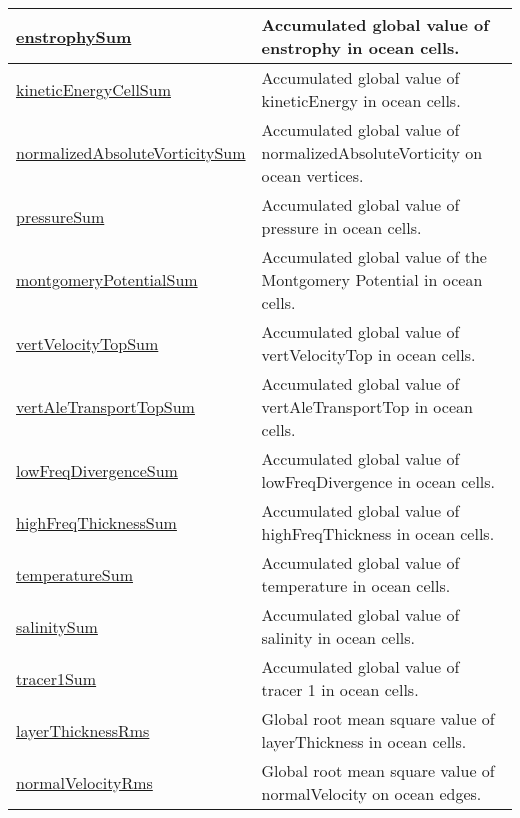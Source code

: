 {\begin{center}
\begin{longtable}{| p{2.0in} | p{4.0in} |}
	\hline
	\hyperref[subsec:var_sec_amGlobalStats_enstrophySum]{enstrophySum} & Accumulated global value of enstrophy in ocean cells. \\
	\hline
	\hyperref[subsec:var_sec_amGlobalStats_kineticEnergyCellSum]{kineticEnergyCellSum} & Accumulated global value of kineticEnergy in ocean cells. \\
	\hline
	\hyperref[subsec:var_sec_amGlobalStats_normalizedAbsoluteVorticitySum]{normalizedAbsoluteVorticitySum} & Accumulated global value of normalizedAbsoluteVorticity on ocean vertices. \\
	\hline
	\hyperref[subsec:var_sec_amGlobalStats_pressureSum]{pressureSum} & Accumulated global value of pressure in ocean cells. \\
	\hline
	\hyperref[subsec:var_sec_amGlobalStats_montgomeryPotentialSum]{montgomeryPotentialSum} & Accumulated global value of the Montgomery Potential in ocean cells. \\
	\hline
	\hyperref[subsec:var_sec_amGlobalStats_vertVelocityTopSum]{vertVelocityTopSum} & Accumulated global value of vertVelocityTop in ocean cells. \\
	\hline
	\hyperref[subsec:var_sec_amGlobalStats_vertAleTransportTopSum]{vertAleTransportTopSum} & Accumulated global value of vertAleTransportTop in ocean cells. \\
	\hline
	\hyperref[subsec:var_sec_amGlobalStats_lowFreqDivergenceSum]{lowFreqDivergenceSum} & Accumulated global value of lowFreqDivergence in ocean cells. \\
	\hline
	\hyperref[subsec:var_sec_amGlobalStats_highFreqThicknessSum]{highFreqThicknessSum} & Accumulated global value of highFreqThickness in ocean cells. \\
	\hline
	\hyperref[subsec:var_sec_amGlobalStats_temperatureSum]{temperatureSum} & Accumulated global value of temperature in ocean cells. \\
	\hline
	\hyperref[subsec:var_sec_amGlobalStats_salinitySum]{salinitySum} & Accumulated global value of salinity in ocean cells. \\
	\hline
	\hyperref[subsec:var_sec_amGlobalStats_tracer1Sum]{tracer1Sum} & Accumulated global value of tracer 1 in ocean cells. \\
	\hline
	\hyperref[subsec:var_sec_amGlobalStats_layerThicknessRms]{layerThicknessRms} & Global root mean square value of layerThickness in ocean cells. \\
	\hline
	\hyperref[subsec:var_sec_amGlobalStats_normalVelocityRms]{normalVelocityRms} & Global root mean square value of normalVelocity on ocean edges. \\

\end{longtable}
\end{center}}

